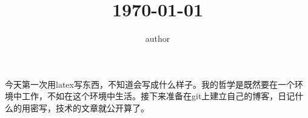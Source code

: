 \documentclass[a4paper]{article}
\begin{document}
\title{\today}
\author{author}
\maketitle

\begin{paragraph}
今天第一次用latex写东西，不知道会写成什么样子。我的哲学是既然要在一个环境中工作，不如在这个环境中生活。接下来准备在git上建立自己的博客，日记什么的用密写，技术的文章就公开算了。
\end{paragraph}
\end{document}
